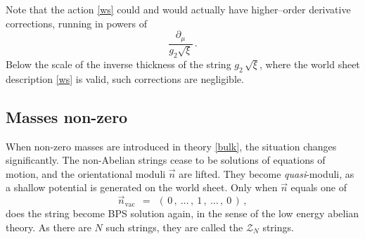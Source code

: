 \documentclass[12pt]{article}
\def\beq{\begin{equation}}
\def\eeq{\end{equation}}
\newcommand{\p}{\partial}
\newcommand{\mc}[1]{\mathcal{#1}}
\newcommand{\nvac}{\vec{n}{}_\text{vac}}
\begin{document}
	Note that the action \eqref{ws} could and would actually have higher--order derivative corrections, running in powers of
\beq
\label{higher}
	\frac{\p_\mu}{g_2\sqrt{\xi}}\,.
\eeq
	Below the scale of the inverse thickness of the string $ g_2\,\sqrt{\xi} $, where the world sheet
	description \eqref{ws} is valid, such corrections are negligible.


\subsection{Masses non-zero}

	When non-zero masses are introduced in theory \eqref{bulk}, the situation changes significantly.
	The non-Abelian strings cease to be solutions of equations of motion, and the orientational moduli $ \vec{n} $ are lifted.
	They become {\it quasi}-moduli, as a shallow potential is generated on the world sheet.
	Only when $ \vec{n} $ equals one of 
\beq
\label{nvac}
	\nvac    ~~=~~    (\, 0\,,~ \dots\,,~1\,,~ \dots\,,~ 0 \,)\,,
\eeq
	does the string become BPS solution  again, in the sense of the low energy abelian theory.
	As there are $ N $ such strings, they are called the $ \mc{Z}_N $ strings.
\end{document}
